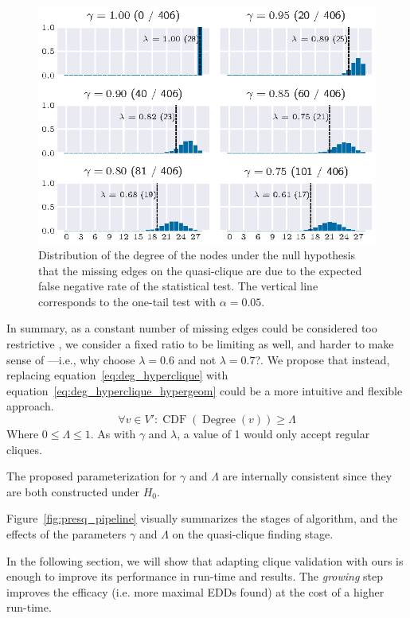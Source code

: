 \begin{figure}[ht]
    \centering
    \includegraphics{images/presq/hypergeom}
    \caption{Distribution of the degree of the nodes under the null hypothesis that the 
    missing edges on the quasi-clique are due to the expected false negative rate of the
    statistical test.
    The vertical line corresponds to the one-tail test with $\alpha = 0.05$.}
    \label{fig:hypergeom_sf}
\end{figure}

In summary, as a constant number of missing edges could be considered
too restrictive \cite{brunato2007effectively}, we consider a fixed ratio to be
limiting as well, and harder to make sense of ---i.e., why choose $\lambda = 0.6$
and not $\lambda = 0.7$?.
We propose that instead, replacing equation~\ref{eq:deg_hyperclique}
with equation~\ref{eq:deg_hyperclique_hypergeom} could be a more intuitive and
flexible approach.
\begin{equation}
    \forall v \in V': \operatorname{CDF}(\operatorname{Degree}(v)) \ge \Lambda
    \label{eq:deg_hyperclique_hypergeom}
\end{equation}
Where $0 \le \Lambda \le 1$. As with $\gamma$ and $\lambda$, a value of 1 would only accept
regular cliques.

The proposed parameterization for $\gamma$ and $\Lambda$ are internally consistent
since they are both constructed under $H_0$.

Figure~\ref{fig:presq_pipeline} visually summarizes the stages of \PresQ algorithm,
and the effects of the parameters $\gamma$ and $\Lambda$ on the quasi-clique finding stage.

In the following section, we will show that adapting \Find clique validation with ours
is enough to improve its performance in run-time and results. The \emph{growing}
step improves the efficacy (i.e. more maximal EDDs found) at the cost of a higher run-time.

